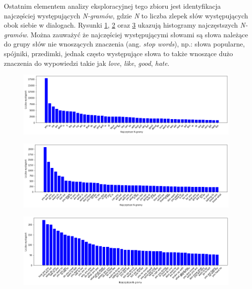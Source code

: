 Ostatnim elementem analizy eksploracyjnej tego zbioru jest identyfikacja najczęściej występujących \textit{N-gramów}, gdzie \textit{N} to liczba zlepek słów występujących obok siebie w dialogach. Rysunki \ref{rys:semeval_1_gram}, \ref{rys:semeval_2_gramy} oraz \ref{rys:semeval_3_gram} ukazują histogramy najczęstszych \textit{N-gramów}. Można zauważyć że najczęściej występującymi słowami są słowa należące do grupy słów nie wnoszących znaczenia (ang. \textit{stop words}), np.: słowa popularne, spójniki, przedimki, jednak często występujące słowa to także wnoszące dużo znaczenia do wypowiedzi takie jak \textit{love}, \textit{like}, \textit{good}, \textit{hate}.

\begin{figure}[t]
\centering\includegraphics[width=\textwidth]{figures/semeval_1_gram.png}
\label{rys:semeval_1_gram}
\end{figure}

\begin{figure}[t]
\centering\includegraphics[width=\textwidth]{figures/semeval_2_gramy.png}
\label{rys:semeval_2_gramy}
\end{figure}

\begin{figure}[t]
\centering\includegraphics[width=\textwidth]{figures/semeval_3_gram.png}
\label{rys:semeval_3_gram}
\end{figure}
